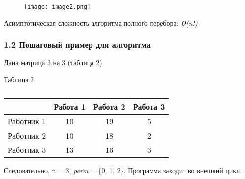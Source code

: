 \documentclass[]{article}
\begin{document}
\begin{figure}
    \centering
    \texttt{[image: image2.png]}
    \caption{}
    \label{fig:enter-label}
\end{figure}


Асимптотическая сложность алгоритма полного перебора: \emph{O(n!)}

\hypertarget{\textbf{ПошаговыйПП}}{%
\subsubsection{\texorpdfstring{\textbf{1.2 Пошаговый пример для
алгоритма}}{1.2 Пошаговый пример для алгоритма}}\label{ПошаговыйПП}}

Дана матрица 3 на 3 (таблица 2)

Таблица 2

\begin{table}[h]
    \centering
    \begin{tabular}{|c|c|c|c|}
    \hline
    & Работа 1 & Работа 2 & Работа 3 \\ \hline
    Работник 1 & 10 & 19 & 5 \\ \hline
    Работник 2 & 10 & 18 & 2 \\ \hline
    Работник 3 & 13 & 16 & 3 \\ \hline
    \end{tabular}
    \caption{}
    \label{tab:work_and_workers}
\end{table}

Следовательно, n = 3, \emph{perm} = \{0, 1, 2\}. Программа заходит во
внешний цикл.
\end{document}
